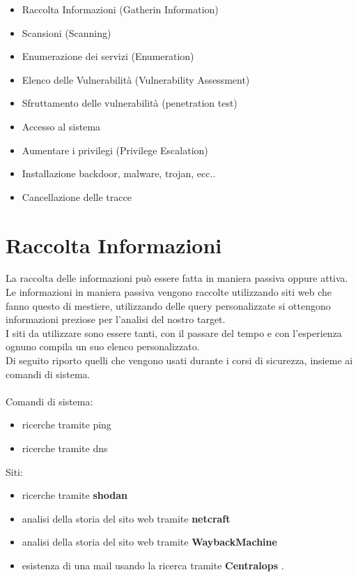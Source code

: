 \documentclass[a4paper,12pt]{article}
\begin{document}
\begin{itemize}
\item Raccolta Informazioni (Gatherin Information)
\item Scansioni (Scanning)
\item Enumerazione  dei servizi (Enumeration)
\item Elenco delle Vulnerabilità (Vulnerability Assessment)
\item Sfruttamento delle vulnerabilità (penetration test)
\item Accesso al sistema
\item Aumentare i privilegi (Privilege Escalation)
\item Installazione backdoor, malware, trojan, ecc..
\item Cancellazione delle tracce

\end{itemize}

\section{Raccolta Informazioni}

La raccolta delle informazioni può essere fatta in maniera passiva oppure attiva. 
Le informazioni in maniera passiva vengono raccolte utilizzando siti web che fanno questo di mestiere, utilizzando delle query personalizzate si ottengono informazioni preziose per l'analisi del nostro target. \\
I siti da utilizzare sono essere tanti, con il passare del tempo e con l'esperienza ognuno compila un suo elenco personalizzato. \\ Di seguito riporto quelli che vengono usati durante i corsi di sicurezza, insieme ai comandi di sistema.\\ 
\\
Comandi di sistema:

\begin{itemize}
    \item ricerche tramite ping 
    \item ricerche tramite dns
\end{itemize}
Siti:
\begin{itemize}
    \item ricerche tramite \textbf{shodan} \cite{shodan}
    \item analisi della storia del sito web tramite \textbf{netcraft} \cite{netcraft}
    \item analisi della storia del sito web tramite \textbf{WaybackMachine} \cite{wayback}
    \item esistenza di una mail usando la ricerca tramite \textbf{Centralops} \cite{centralops}.
\end{itemize}
\end{document}
